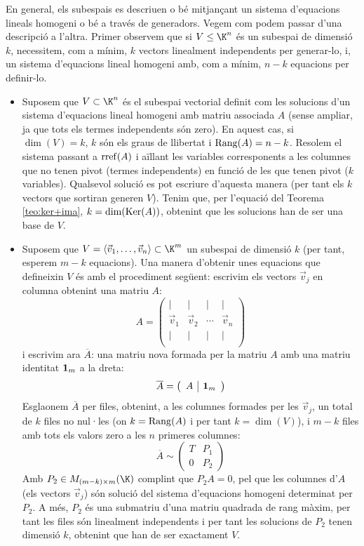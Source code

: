 \begin{observacio}
En general, els subespais es descriuen o bé mitjançant un sistema d'equacions lineals homogeni o bé a través de generadors. Vegem com podem passar d'una descripció a l'altra. Primer observem que si $V\leq \K^n$ és un subespai de dimensió $k$, necessitem, com a mínim, $k$ vectors linealment independents per generar-lo, i, un sistema d'equacions lineal homogeni amb, com a mínim, $n-k$ equacions per definir-lo. 
\begin{itemize}
    \item Suposem que $V\subset\K^n$ és el subespai vectorial definit com les solucions d'un sistema d'equacions lineal homogeni amb matriu associada $A$ (sense ampliar, ja que tots els termes independents són zero). En aquest cas, si $\dim(V)=k$, $k$ són els graus de llibertat i $\operatorname{Rang}(A)=n-k$. Resolem el sistema passant a $\operatorname{rref}(A)$ i aïllant les variables corresponents a les columnes que no tenen pivot (termes independents) en funció de les que tenen pivot ($k$ variables). Qualsevol solució es pot escriure d'aquesta manera (per tant els $k$ vectors que sortiran generen $V$). Tenim que, per l'equació del Teorema \ref{teo:ker+ima}, $k=\dim(\operatorname{Ker}(A))$, obtenint que les solucions han de ser una base de $V$.
    \item Suposem que $V=\langle \vec v_1, \dots, \vec v_n\rangle \subset \K^m$ un subespai de dimensió $k$ (per tant, esperem $m-k$ equacions). Una manera d'obtenir unes equacions que defineixin $V$ és amb el procediment següent: escrivim els vectors $\vec v_j$ en columna obtenint una matriu $A$:
    $$
    A=\left(\begin{array}{cccc}
    \mid & \mid &\mid & \mid \\
    \vec v_1 & \vec v_2 &\cdots& \vec v_n \\
    \mid & \mid &\mid & \mid \\
    \end{array}\right)
    $$
    i escrivim ara $\overline A$: una matriu nova formada per la matriu $A$ amb una matriu identitat $\mathbf{1}_m$ a la dreta:
    $$
    \overline A=
    \left(\begin{array}{c|c}
    A & \mathbf{1}_m\\
    \end{array}\right)
    $$
    Esglaonem $\overline A$ per files, obtenint, a les columnes formades per les $\vec v_j$, un total de $k$ files no nul·les (on $k=\operatorname{Rang}(A)$ i per tant $k=\dim(V)$), i $m-k$ files amb tots els valors zero a les $n$ primeres columnes:
    $$
    \overline A \sim
    \left(
    \begin{array}{c|c}
    T & P_1 \\ \hline
    0 & P_2
    \end{array}
    \right)
    $$
    Amb $P_2\in M_{(m-k)\times m}(\K)$ complint que $P_2 A=0$, pel que les columnes d'$A$ (els vectors $\vec v_j$) són solució del sistema d'equacions homogeni determinat per $P_2$. A més, $P_2$ és una submatriu d'una matriu quadrada de rang màxim, per tant les files són linealment independents i per tant les solucions de $P_2$ tenen dimensió $k$, obtenint que han de ser exactament $V$.
\end{itemize}
\end{observacio}
